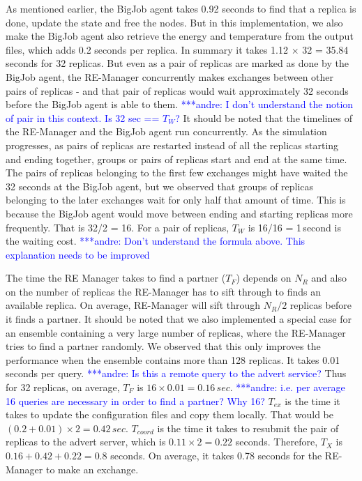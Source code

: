 \documentclass{rspublic}
\newcommand{\alnote}[1]{ {\textcolor{blue} { ***andre: #1 }}}
\newcommand{\alnote}[1]{}
\begin{document}

As mentioned earlier, the BigJob agent takes 0.92 seconds to find that
a replica is done, update the state and free the nodes. But in this
implementation, we also make the BigJob agent also retrieve the energy
and temperature from the output files, which adds 0.2 seconds per
replica. In summary it takes 1.12 $\times$ 32 = 35.84 seconds for 32
replicas. But even as a pair of replicas are marked as done by the
BigJob agent, the RE-Manager concurrently makes exchanges between
other pairs of replicas - and that pair of replicas would wait
approximately 32 seconds before the BigJob agent is able to
them. \alnote{I don't understand the notion of pair in this
  context. Is 32 sec == $T_W$?} It should be noted that the timelines
of the RE-Manager and the BigJob agent run concurrently.  As the
simulation progresses, as pairs of replicas are restarted instead of
all the replicas starting and ending together, groups or pairs of
replicas start and end at the same time. The pairs of replicas
belonging to the first few exchanges might have waited the 32 seconds
at the BigJob agent, but we observed that groups of replicas belonging
to the later exchanges wait for only half that amount of time. This is
because the BigJob agent would move between ending and starting
replicas more frequently. That is 32/2 = 16.  For a pair of replicas,
$T_W$ is 16/16 = 1\,second is the waiting cost.  \alnote{Don't
  understand the formula above. This explanation needs to be improved}

The time the RE Manager takes to find a partner ($T_F$) depends on
$N_R$ and also on the number of replicas the RE-Manager has to sift
through to finds an available replica. On average, RE-Manager will
sift through $N_R/2$ replicas before it finds a partner. %
It should be noted that we also implemented a
special case for an ensemble containing a very large number of
replicas, where the RE-Manager tries to find a partner randomly. We
observed that this only improves the performance when the ensemble
contains more than 128 replicas. It takes 0.01 seconds per
query. \alnote{Is this a remote query to the advert service?}  Thus
for 32 replicas, on average, $T_F$ is $16\times
0.01=0.16\,sec$. \alnote{i.e. per average 16 queries are necessary in
  order to find a partner? Why 16?}  $T_{ex}$ is the time it takes to
update the configuration files and copy them locally. That would be
$({0.2+0.01})\times 2=0.42\,sec$. $T_{coord}$ is the time it takes to
resubmit the pair of replicas to the advert server, which is
$0.11\times 2 = 0.22$ seconds. Therefore, $T_{X}$ is
$0.16+0.42+0.22=0.8$ seconds. On average, it takes 0.78
seconds for the RE-Manager to make an exchange.
\end{document}

